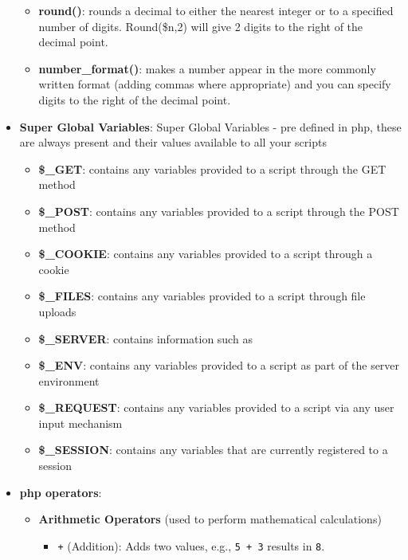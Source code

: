 \documentclass{report}
\begin{document}
\begin{itemize}
            \begin{itemize}
                \item \textbf{round()}: rounds a decimal to either the nearest integer or to a specified number of digits. Round(\$n,2) will give 2 digits to the right of the decimal point.
                \item \textbf{number\_format()}: makes a number appear in the more commonly written format (adding commas where appropriate) and you can specify digits to the right of the decimal point.
            \end{itemize}
        \item \textbf{Super Global Variables}: Super Global Variables - pre defined in php, these are always present and their values available to all your scripts
            \begin{itemize}
                \item \textbf{\$\_GET}: contains any variables provided to a script through the GET method
                \item \textbf{\$\_POST}: contains any variables provided to a script through the POST method
                \item \textbf{\$\_COOKIE}: contains any variables provided to a script through a cookie
                \item \textbf{\$\_FILES}: contains any variables provided to a script through file uploads
                \item \textbf{\$\_SERVER}: contains information such as
                \item \textbf{\$\_ENV}: contains any variables provided to a script as part of the server environment
                \item \textbf{\$\_REQUEST}: contains any variables provided to a script via any user input mechanism
                \item \textbf{\$\_SESSION}: contains any variables that are currently registered to a session
            \end{itemize}
        \item \textbf{php operators}: 
            \begin{itemize}
                \item \textbf{Arithmetic Operators} (used to perform mathematical calculations)
                    \begin{itemize}
                        \item \texttt{+} (Addition): Adds two values, e.g., \texttt{5 + 3} results in \texttt{8}.

\end{itemize}
\end{itemize}
\end{itemize}
\end{document}

